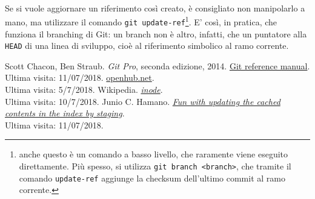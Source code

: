 \documentclass[12pt]{article}
\def\code#1{\texttt{#1}}
\begin{document}
\ \\Se si vuole aggiornare un riferimento così creato, è consigliato non manipolarlo a mano, ma utilizzare il comando \code{git update-ref}\footnote{anche questo è un comando a basso livello, che raramente viene eseguito direttamente. Più spesso, si utilizza \code{git branch <branch>}, che tramite il comando \code{update-ref} aggiunge la checksum dell'ultimo commit al ramo corrente.}. 
E' così, in pratica, che funziona il branching di Git: un branch non è altro, infatti, che un puntatore alla \code{HEAD} di una linea di sviluppo, cioè al riferimento simbolico al ramo corrente. 
\newpage
\begin{thebibliography}{9}
	Scott Chacon, Ben Straub. \textit{Git Pro}, seconda edizione, 2014.
	\href{https://git-scm.com/docs}{Git reference manual}. \\Ultima visita: 11/07/2018.
	\url{openhub.net}. \\Ultima visita: 5/7/2018.
	Wikipedia. \href{https://en.wikipedia.org/wiki/Inode}{\textit{inode}}. \\Ultima visita: 10/7/2018.
	Junio C. Hamano. \href{https://gitster.livejournal.com/39629.html}{\textit{Fun with updating the cached contents in the index by staging}}. \\Ultima visita: 11/07/2018.
\end{thebibliography}
\end{document}

